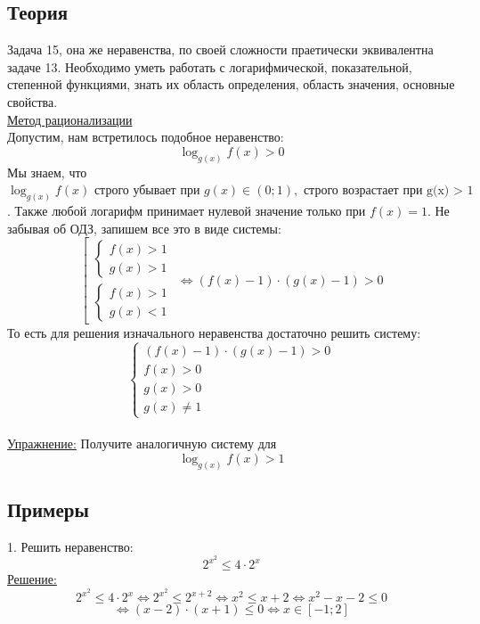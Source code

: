 \documentclass{article}
\begin{document}
\subsection{Теория}
Задача 15, она же неравенства, по своей сложности праетически 
эквивалентна задаче 13. Необходимо уметь работать с логарифмической, показательной, степенной функциями, знать их область определения, область значения, основные свойства. 
\\
\underline{Метод рационализации}
\\
Допустим, нам встретилось подобное неравенство:
\[ \log_{g(x)} f(x) > 0 \]
Мы знаем, что \( \log_{g(x)} f(x) \text{ строго убывает  при } g(x) \in (0;1),  
\text{ строго возрастает при g(x) > 1 }\). Также любой логарифм принимает
нулевой значение только при $f(x) = 1$. Не забывая об ОДЗ, 
запишем все это в виде системы:
\begin{equation*}
    \left[
    \begin{gathered}
    \begin{cases}
    f(x) > 1 \\
    g(x) > 1
    \end{cases}
    \\
    \begin{cases}
    f(x) > 1 \\
    g(x) < 1
    \end{cases}
    \end{gathered}
    \right.
    \Leftrightarrow
    (f(x) - 1) \cdot (g(x) - 1) > 0
\end{equation*}
То есть для решения изначального неравенства достаточно решить систему:
\begin{equation*}
    \begin{cases}
    (f(x) - 1) \cdot (g(x) - 1) > 0 \\
    f(x) > 0 \\
    g(x) > 0 \\
    g(x) \neq 1
    \end{cases}
\end{equation*}
\\
\underline{Упражнение:} Получите аналогичную систему для 
\[
\log_{g(x)} f(x) > 1
\]
\subsection{Примеры}
1. Решить неравенство: 
 \[ 2^{x^2} \leq 4\cdot 2^x\]
 \underline{Решение:}
 \[ 2^{x^2} \leq 4\cdot 2^x \Leftrightarrow 2^{x^2} \leq 2^{x + 2} 
 \Leftrightarrow x^2 \leq x + 2 \Leftrightarrow x^2 - x - 2 \leq 0\]
 \[ \Leftrightarrow (x - 2) \cdot (x + 1) \leq 0 \Leftrightarrow x \in \left[ -1; 2 \right] \]
 
\end{document}
